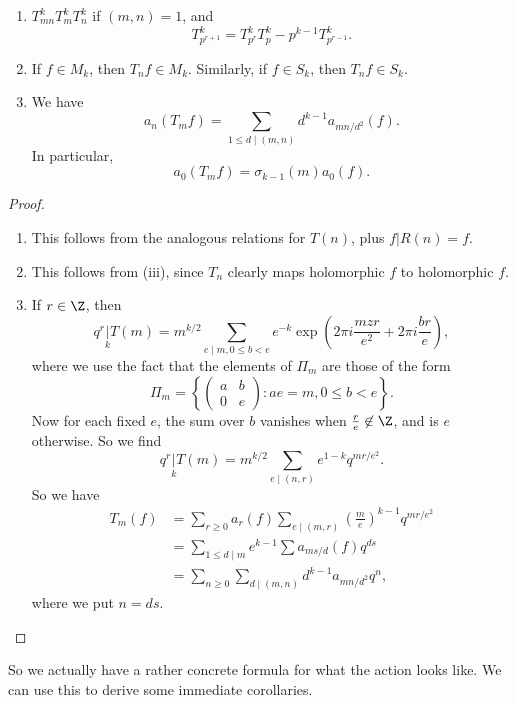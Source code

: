 \documentclass[a4paper]{article}
\begin{document}
\begin{prop}\leavevmode
  \begin{enumerate}
    \item $T_{mn}^k T_m^k T_n^k$ if $(m, n) = 1$, and
      \[
        T_{p^{r + 1}}^k = T_{p^r}^k T_p^k - p^{k - 1} T_{p^{r - 1}}^k.
      \]
     \item If $f \in M_k$, then $T_n f \in M_k$. Similarly, if $f \in S_k$, then $T_n f \in S_k$.
     \item We have
       \[
         a_n (T_m f) = \sum_{1 \leq d \mid (m, n)} d^{k - 1}a_{mn/d^2} (f).
       \]
       In particular,
       \[
         a_0(T_m f) = \sigma_{k - 1}(m) a_0(f).
       \]
  \end{enumerate}
\end{prop}
\begin{proof}\leavevmode
  \begin{enumerate}
    \item This follows from the analogous relations for $T(n)$, plus $f|R(n) = f$.
    \item This follows from (iii), since $T_n$ clearly maps holomorphic $f$ to holomorphic $f$.
    \item If $r \in \Z$, then
      \[
        q^r \underset{k}{|} T(m) = m^{k/2} \sum_{e \mid m, 0 \leq b < e} e^{-k}\exp\left(2\pi i \frac{mzr }{e^2} + 2\pi i \frac{br}{e}\right),
      \]
      where we use the fact that the elements of $\Pi_m$ are those of the form
      \[
        \Pi_m = \left\{
          \begin{pmatrix}
            a & b\\
            0 & e
          \end{pmatrix} : ae = m, 0 \leq b < e
        \right\}.
      \]
      Now for each fixed $e$, the sum over $b$ vanishes when $\frac{r}{e} \not\in \Z$, and is $e$ otherwise. So we find
      \[
        q^r \underset{k}{|} T(m) = m^{k/2} \sum_{e \mid (n, r)} e^{1 - k} q^{mr/e^2}.
      \]
      So we have
      \begin{align*}
        T_m(f) &= \sum_{r \geq 0} a_r(f) \sum_{e \mid (m, r)} \left(\frac{m}{e}\right)^{k - 1} q^{mr/e^2} \\
        &= \sum_{1 \leq d \mid m} e^{k - 1} \sum a_{ms/d} (f) q^{ds} \\
        &= \sum_{n \geq 0} \sum_{d \mid (m, n)} d^{k - 1} a_{mn/d^2} q^n,
      \end{align*}
      where we put $n = ds$.
  \end{enumerate}
\end{proof}
So we actually have a rather concrete formula for what the action looks like. We can use this to derive some immediate corollaries.
\end{document}
